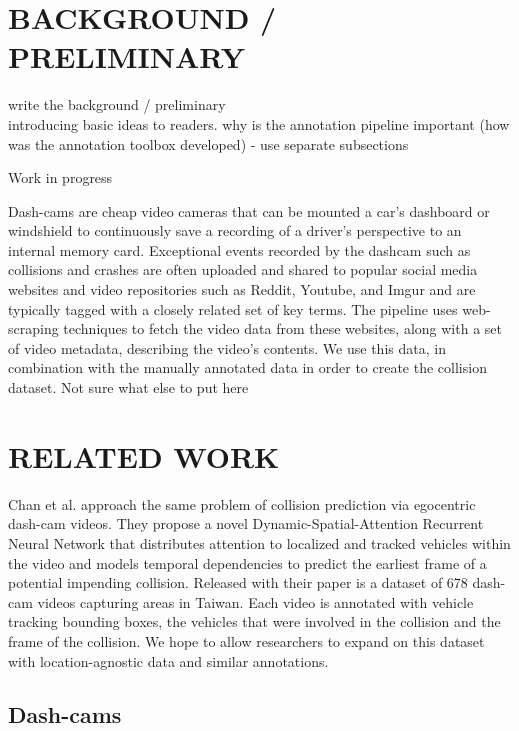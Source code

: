 \documentclass[letterpaper, 10 pt, conference]{IEEEconf}
\newcommand{\todo}[1]{{\color{red}#1}}
\begin{document}
\section{BACKGROUND / PRELIMINARY}
\todo{write the background / preliminary} \\
introducing basic ideas to readers. why is the annotation pipeline important (how was the annotation toolbox developed) - use separate subsections

\todo{Work in progress}

Dash-cams are cheap video cameras that can be mounted a car's dashboard or windshield to continuously save a recording of a driver's perspective to an internal memory card.
Exceptional events recorded by the dashcam such as collisions and crashes are often uploaded and shared to popular social media websites and video repositories such as Reddit, Youtube, and Imgur and are typically tagged with a closely related set of key terms.
The pipeline uses web-scraping techniques to fetch the video data from these websites, along with a set of video metadata, describing the video's contents.
We use this data, in combination with the manually annotated data in order to create the collision dataset.
\todo{Not sure what else to put here}



\section{RELATED WORK}

Chan et al. \cite{chan2016anticipating} approach the same problem of collision prediction via egocentric dash-cam videos. They propose a novel Dynamic-Spatial-Attention Recurrent Neural Network that distributes attention to localized and tracked vehicles within the video and models temporal dependencies to predict the earliest frame of a potential impending collision. Released with their paper is a dataset of 678 dash-cam videos capturing areas in Taiwan. Each video is annotated with vehicle tracking bounding boxes, the vehicles that were involved in the collision and the frame of the collision. We hope to allow researchers to expand on this dataset with location-agnostic data and similar annotations.



\subsection{Dash-cams}%
\label{sub:dash_cams}
\end{document}
